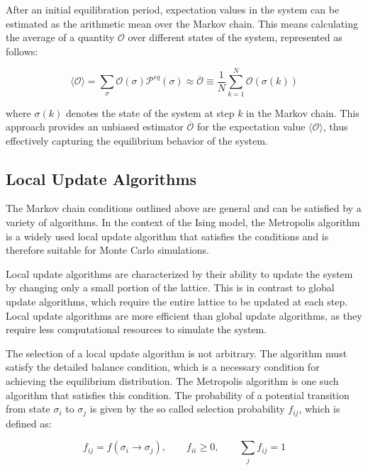 After an initial equilibration period, expectation values in the system can be
estimated as the arithmetic mean over the Markov chain. This means calculating
the average of a quantity \( \mathcal{O} \) over different states of the system,
represented as follows:

\begin{equation}
    \langle \mathcal{O} \rangle = \sum_{\sigma}\mathcal{O}(\sigma)\mathcal{P}^{eq}(\sigma) \approx \overline{\mathcal{O}} \equiv \frac{1}{N} \sum_{k=1}^{N}\mathcal{O}(\sigma(k))
\end{equation}

where \( \sigma(k) \) denotes the state of the system at step \( k \) in the
Markov chain. This approach provides an unbiased estimator
$\overline{\mathcal{O}} $ for the expectation value \( \langle \mathcal{O}
\rangle \), thus effectively capturing the equilibrium behavior of the system.

\subsection{Local Update Algorithms}

The Markov chain conditions outlined above are general and can be satisfied by a
variety of algorithms. In the context of the Ising model, the Metropolis
algorithm is a widely used local update algorithm that satisfies the conditions
and is therefore suitable for Monte Carlo simulations.

Local update algorithms are characterized by their ability to update the system
by changing only a small portion of the lattice. This is in contrast to global
update algorithms, which require the entire lattice to be updated at each step.
Local update algorithms are more efficient than global update algorithms, as
they require less computational resources to simulate the system.

The selection of a local update algorithm is not arbitrary. The algorithm must
satisfy the detailed balance condition, which is a necessary condition for
achieving the equilibrium distribution. The Metropolis algorithm is one such
algorithm that satisfies this condition. The probability of a potential
transition from state \( \sigma_i \) to \( \sigma_j \) is given by the so called
selection probability \( f_{ij} \), which is defined as:

\begin{equation}
    f_{ij} = f(\sigma_i \rightarrow \sigma_j), \qquad f_{ii} \geq 0, \qquad \sum_j f_{ij} = 1
\end{equation}

